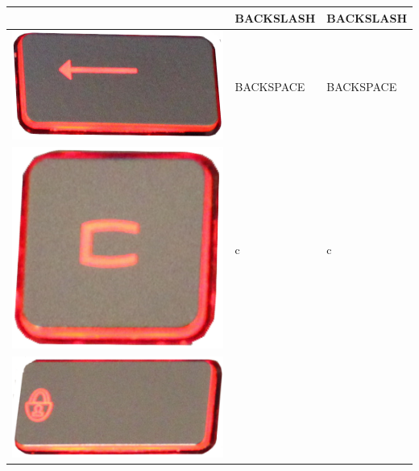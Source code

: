 \begin{longtable}{|cll|}
\begin{minipage}[c]{.3\textwidth}
\vspace{0.2cm}
\end{minipage} & BACKSLASH & BACKSLASH\\
\hline
\begin{minipage}[c]{.3\textwidth}
\vspace{0.2cm}
\includegraphics[scale=0.06]{Images/KeyMapping/BACKSPACE}
\vspace{0.2cm}
\end{minipage} & BACKSPACE & BACKSPACE\\
\hline
\begin{minipage}[c]{.3\textwidth}
\vspace{0.2cm}
\includegraphics[scale=0.06]{Images/KeyMapping/c}
\vspace{0.2cm}
\end{minipage} & c & c\\
\hline
\begin{minipage}[c]{.3\textwidth}
\vspace{0.2cm}
\includegraphics[scale=0.06]{Images/KeyMapping/CAPS_LOCK}

\end{minipage}
\end{longtable}
